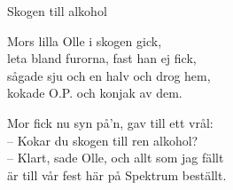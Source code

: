 \begin{song}{Skogen till alkohol}
	
	
	
	
	Mors lilla Olle i skogen gick,\\
	leta bland furorna, fast han ej fick,\\
	sågade sju och en halv och drog hem,\\
	kokade O.P. och konjak av dem.
	
	Mor fick nu syn på'n, gav till ett vrål:\\
	-- Kokar du skogen till ren alkohol?\\
	-- Klart, sade Olle, och allt som jag fällt\\
	är till vår fest här på Spektrum beställt.
	
\end{song}

